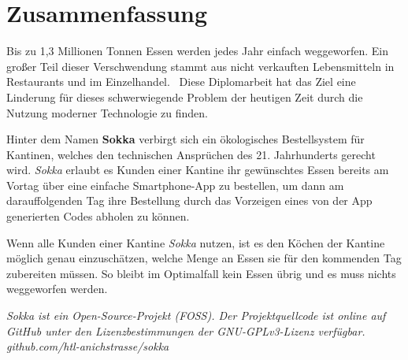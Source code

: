 \section*{Zusammenfassung}

Bis zu 1,3 Millionen Tonnen Essen werden jedes Jahr einfach weggeworfen. Ein großer Teil dieser Verschwendung stammt aus nicht verkauften Lebensmitteln in Restaurants und im Einzelhandel.~\cite{depta2018} Diese Diplomarbeit hat das Ziel eine Linderung für dieses schwerwiegende Problem der heutigen Zeit durch die Nutzung moderner Technologie zu finden.

Hinter dem Namen \textbf{Sokka} verbirgt sich ein ökologisches Bestellsystem für Kantinen, welches den technischen Ansprüchen des 21. Jahrhunderts gerecht wird. \textit{Sokka} erlaubt es Kunden einer Kantine ihr gewünschtes Essen bereits am Vortag über eine einfache Smartphone-App zu bestellen, um dann am darauffolgenden Tag ihre Bestellung durch das Vorzeigen eines von der App generierten Codes abholen zu können.

Wenn alle Kunden einer Kantine \textit{Sokka} nutzen, ist es den Köchen der Kantine möglich genau einzuschätzen, welche Menge an Essen sie für den kommenden Tag zubereiten müssen. So bleibt im Optimalfall kein Essen übrig und es muss nichts weggeworfen werden.

\textit{Sokka ist ein Open-Source-Projekt (FOSS). Der Projektquellcode ist online auf GitHub unter den Lizenzbestimmungen der GNU-GPLv3-Lizenz verfügbar. github.com/htl-anichstrasse/sokka}

\newpage